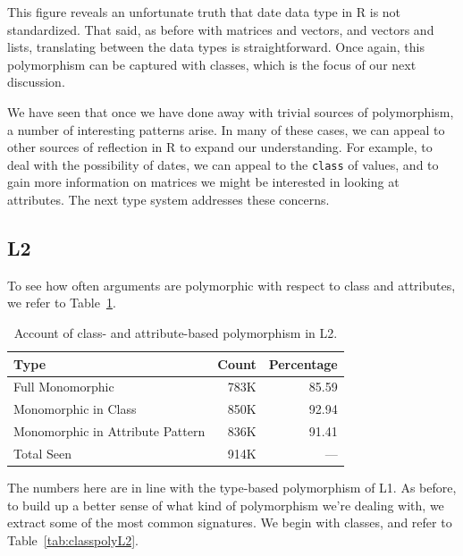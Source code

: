 \documentclass[acmsmall,10pt,review,anonymous]{acmart}\settopmatter{printfolios=true,printccs=false,printacmref=false}
\newcommand{\code}[1]{\lstinline|#1|\xspace}
\begin{document}
This figure reveals an unfortunate truth that date data type in R is not standardized.
That said, as before with matrices and vectors, and vectors and lists, translating between the data types is straightforward.
Once again, this polymorphism can be captured with classes, which is the focus of our next discussion.

We have seen that once we have done away with trivial sources of polymorphism, a number of interesting patterns arise.
In many of these cases, we can appeal to other sources of reflection in R to expand our understanding.
For example, to deal with the possibility of dates, we can appeal to the \code{class} of values, and to gain more information on matrices we might be interested in looking at attributes.
The next type system addresses these concerns.

%
%
%
%
\subsection{L2}


To see how often arguments are polymorphic with respect to class and attributes, we refer to Table~\ref{tab:classcountsL2}.

\begin{table}[ht]
\label{tab:classcountsL2}
\centering
\begin{tabular}{lrr}
  \hline
Type & Count & Percentage \\
  \hline
Full Monomorphic & 783K & 85.59 \\
  Monomorphic in Class & 850K & 92.94 \\
  Monomorphic in Attribute Pattern & 836K & 91.41 \\
  Total Seen & 914K & --- \\
   \hline
\end{tabular}
\caption{Account of class- and attribute-based polymorphism in L2.}
\end{table}

The numbers here are in line with the type-based polymorphism of L1.
As before, to build up a better sense of what kind of polymorphism we're dealing with, we extract some of the most common signatures.
We begin with classes, and refer to Table~\ref{tab:classpolyL2}.
\end{document}
